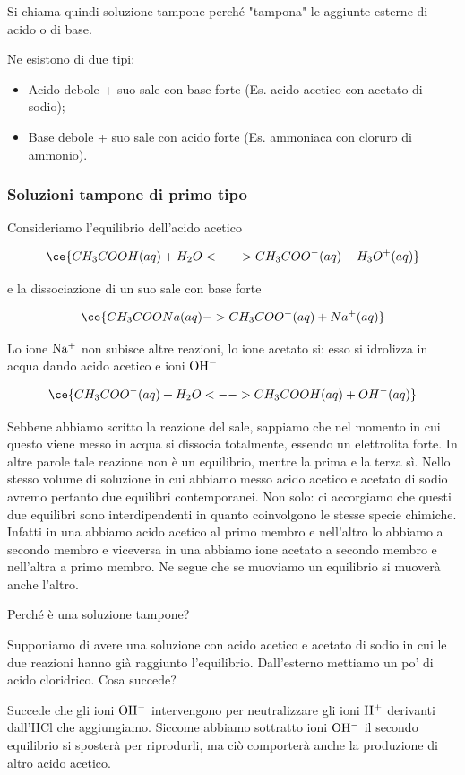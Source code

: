 Si chiama quindi soluzione tampone perché "tampona" le aggiunte esterne di acido o di base.

Ne esistono di due tipi:

\begin{itemize}
    \item Acido debole + suo sale con base forte
    (Es. acido acetico con acetato di sodio);
    \item Base debole + suo sale con acido forte
    (Es. ammoniaca con cloruro di ammonio).
\end{itemize}

\subsubsection{Soluzioni tampone di primo tipo}
Consideriamo l'equilibrio dell'acido acetico

$$\ce{CH_3COOH(aq) + H_2O <--> CH_3COO^-(aq) + H_3O^+(aq)}$$

e la dissociazione di un suo sale con base forte

$$\ce{CH_3COONa(aq) -> CH_3COO^-(aq) + Na^+(aq)}$$

Lo ione $\rm Na^+$ non subisce altre reazioni, lo ione acetato si: esso si idrolizza in acqua dando acido acetico e ioni $\rm OH^-$

$$\ce{CH_3COO^-(aq) + H_2O <--> CH_3COOH(aq) + OH^-(aq)}$$

Sebbene abbiamo scritto la reazione del sale, sappiamo che  nel momento in cui questo viene messo in acqua si dissocia totalmente, essendo un elettrolita forte. In altre parole tale reazione non è un equilibrio, mentre la prima e la terza sì. Nello stesso volume di soluzione in cui abbiamo messo acido acetico e acetato di sodio avremo pertanto due equilibri contemporanei. Non solo: ci accorgiamo che questi due equilibri sono interdipendenti in quanto coinvolgono le stesse specie chimiche. Infatti in una abbiamo acido acetico al primo membro e nell'altro lo abbiamo a secondo membro e viceversa in una abbiamo ione acetato a secondo membro e nell'altra a primo membro. Ne segue che se muoviamo un equilibrio si muoverà anche l'altro.

Perché è una soluzione tampone?

Supponiamo di avere una soluzione con acido acetico e acetato di sodio in cui le due reazioni hanno già raggiunto l'equilibrio. Dall'esterno mettiamo un po' di acido cloridrico. Cosa succede?

Succede che gli ioni $\rm OH^-$ intervengono per neutralizzare gli ioni $\rm H^+$ derivanti dall'HCl che aggiungiamo. Siccome abbiamo sottratto ioni $\rm OH^-$ il secondo equilibrio si sposterà per riprodurli, ma ciò comporterà anche la produzione di altro acido acetico.

